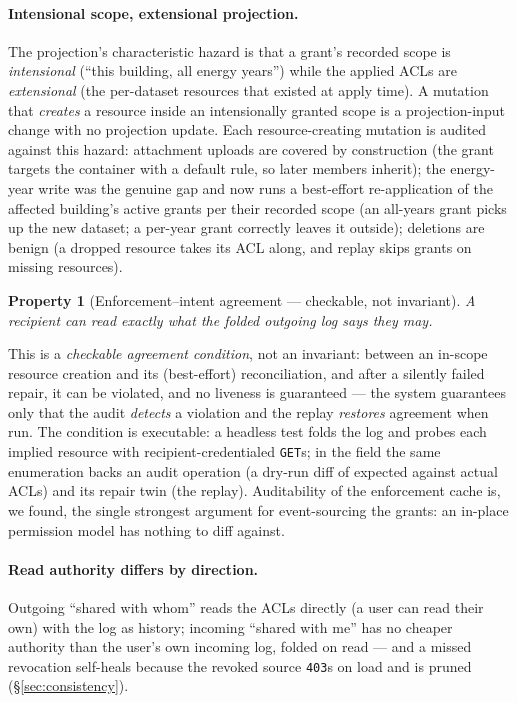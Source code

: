 \documentclass[11pt,a4paper]{article}
\newtheorem{property}{Property}[section]
\theoremstyle{remark}
\newcommand{\code}[1]{\texttt{#1}}
\begin{document}
\paragraph{Intensional scope, extensional projection.}
The projection's characteristic hazard is that a grant's recorded scope is
\emph{intensional} (``this building, all energy years'') while the applied ACLs
are \emph{extensional} (the per-dataset resources that existed at apply time). A
mutation that \emph{creates} a resource inside an intensionally granted scope is
a projection-input change with no projection update. Each resource-creating
mutation is audited against this hazard: attachment uploads are covered by
construction (the grant targets the container with a default rule, so later
members inherit); the energy-year write was the genuine gap and now runs a
best-effort re-application of the affected building's active grants per their
recorded scope (an all-years grant picks up the new dataset; a per-year grant
correctly leaves it outside); deletions are benign (a dropped resource takes its
ACL along, and replay skips grants on missing resources).

\begin{property}[Enforcement--intent agreement --- checkable, not invariant]\label{prop:agreement}
A recipient can read exactly what the folded outgoing log says they may.
\end{property}

This is a \emph{checkable agreement condition}, not an invariant: between an
in-scope resource creation and its (best-effort) reconciliation, and after a
silently failed repair, it can be violated, and no liveness is guaranteed ---
the system guarantees only that the audit \emph{detects} a violation and the
replay \emph{restores} agreement when run. The condition is executable: a headless test folds the log and probes each
implied resource with recipient-credentialed \code{GET}s; in the field the same
enumeration backs an audit operation (a dry-run diff of expected against actual
ACLs) and its repair twin (the replay). Auditability of the enforcement cache is,
we found, the single strongest argument for event-sourcing the grants: an
in-place permission model has nothing to diff against.

\paragraph{Read authority differs by direction.} Outgoing ``shared with whom''
reads the ACLs directly (a user can read their own) with the log as history;
incoming ``shared with me'' has no cheaper authority than the user's own incoming
log, folded on read --- and a missed revocation self-heals because the revoked
source \code{403}s on load and is pruned (\S\ref{sec:consistency}).
\end{document}
